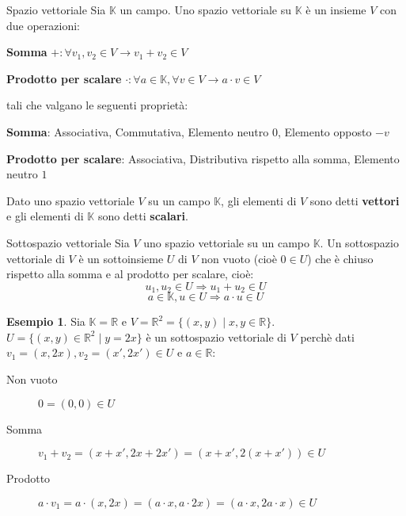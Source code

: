 \documentclass[a4paper]{article}
\theoremstyle{definition}
\newtheorem*{es}{Esempio}
\begin{document}
\begin{deff}{Spazio vettoriale}{}
	Sia $\mathbb{K}$ un campo. Uno spazio vettoriale su $\mathbb{K}$ è un insieme $V$ con due operazioni:
	\begin{description}
		\item \textbf{Somma} $+: \forall v_1, v_2 \in V \rightarrow v_1 + v_2 \in V$
		\item \textbf{Prodotto per scalare} $\cdot: \forall a \in \mathbb{K}, \forall v \in V \rightarrow a \cdot v \in V$
	\end{description}
	tali che valgano le seguenti proprietà:
	\begin{description}
		\item \textbf{Somma}: Associativa, Commutativa, Elemento neutro $0$, Elemento opposto $-v$
		\item \textbf{Prodotto per scalare}: Associativa, Distributiva rispetto alla somma, Elemento neutro $1$
	\end{description}
\end{deff}
Dato uno spazio vettoriale $V$ su un campo $\mathbb{K}$, gli elementi di $V$ sono detti \textbf{vettori} e gli elementi di $\mathbb{K}$ sono detti \textbf{scalari}.

\begin{deff}{Sottospazio vettoriale}{}
	Sia $V$ uno spazio vettoriale su un campo $\mathbb{K}$. Un sottospazio vettoriale di $V$ è un sottoinsieme $U$ di $V$ non vuoto (cioè $0 \in U$) che è chiuso rispetto alla somma e al prodotto per scalare, cioè:
	\[ u_1, u_2 \in U \Rightarrow u_1 + u_2 \in U \]
	\[ a \in \mathbb{K}, u \in U \Rightarrow a \cdot u \in U \]
\end{deff}

\begin{es}
	Sia $\mathbb{K} = \mathbb{R}$ e $V = \mathbb{R}^2 = \{(x, y) \mid x, y \in \mathbb{R}\}$. \\
	$U = \{(x, y) \in \mathbb{R}^2 \mid y = 2x\}$ è un sottospazio vettoriale di $V$ perchè dati $v_1 = (x, 2x), v_2 = (x', 2x') \in U$ e $a \in \mathbb{R}$:
	\begin{description}
		\item[Non vuoto] $0 = (0, 0) \in U$
		\item[Somma] $v_1 + v_2 = (x + x', 2x + 2x') = (x + x', 2(x + x')) \in U$
		\item[Prodotto] $a \cdot v_1 = a \cdot (x, 2x) = (a \cdot x, a \cdot 2x) = (a \cdot x, 2a \cdot x) \in U$
	\end{description}
\end{es}
\end{document}
